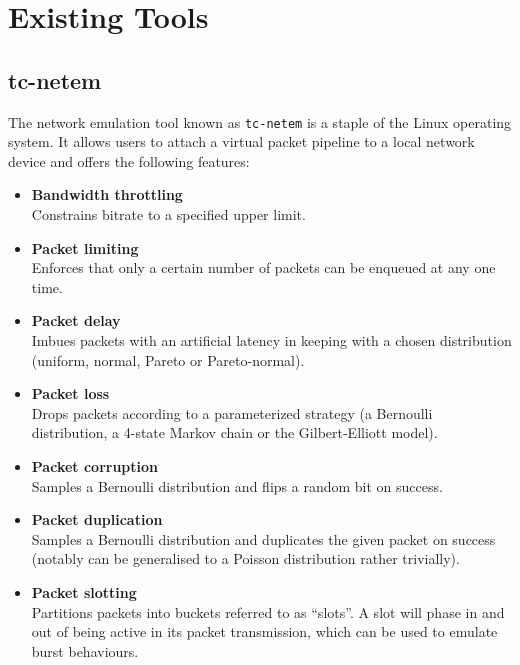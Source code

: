 \section{Existing Tools}

\subsection{tc-netem}

The network emulation tool known as \texttt{tc-netem} is a staple of the Linux operating system\cite{tc_netem_wiki,
    tc_netem_8_man,tc_netem_src}. It allows users to attach a virtual packet pipeline to a local network device and
offers the following features:
\begin{itemize}
    \item \textbf{Bandwidth throttling} \\
    Constrains bitrate to a specified upper limit.
    \item \textbf{Packet limiting} \\
    Enforces that only a certain number of packets can be enqueued at any one time.
    \item \textbf{Packet delay} \\
    Imbues packets with an artificial latency in keeping with a chosen distribution (uniform, normal, Pareto or
    Pareto-normal).
    \item \textbf{Packet loss} \\
    Drops packets according to a parameterized strategy (a Bernoulli distribution, a 4-state Markov chain or the
    Gilbert-Elliott model\cite{ge_model}).
    \item \textbf{Packet corruption} \\
    Samples a Bernoulli distribution and flips a random bit on success.
    \item \textbf{Packet duplication} \\
    Samples a Bernoulli distribution and duplicates the given packet on success (notably can be generalised to a
    Poisson distribution rather trivially).
    \item \textbf{Packet slotting} \\
    Partitions packets into buckets referred to as ``slots''. A slot will phase in and out of being active in its
    packet transmission, which can be used to emulate burst behaviours.
\end{itemize}

